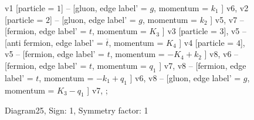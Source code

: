 \documentclass{revtex4}
\begin{document}
\begin{figure}[!htb]
\begin{center}
{    %
v1 [particle = \(1\)] -- [gluon, edge label' = \(g\), momentum = \(k_{1}\) ] v6, 
v2 [particle = \(2\)] -- [gluon, edge label' = \(g\), momentum = \(k_{2}\) ] v5, 
v7 -- [fermion, edge label' = \(t\), momentum = \(K_{3}\) ] v3 [particle = \(3\)], 
v5 -- [anti fermion, edge label' = \(\overline{t}\), momentum = \(K_{4}\) ] v4 [particle = \(4\)], 
v5 -- [fermion, edge label' = \(t\), momentum = \(-K_{4} + k_{2}\) ] v8, 
v6 -- [fermion, edge label' = \(t\), momentum = \(q_{1}\) ] v7, 
v8 -- [fermion, edge label' = \(t\), momentum = \(-k_{1} + q_{1}\) ] v6, 
v8 -- [gluon, edge label' = \(g\), momentum = \(K_{3} - q_{1}\) ] v7, 
};
\end{center}
\caption{Diagram25, Sign: 1, Symmetry factor: 1}
\end{figure}
\newpage
\end{document}
